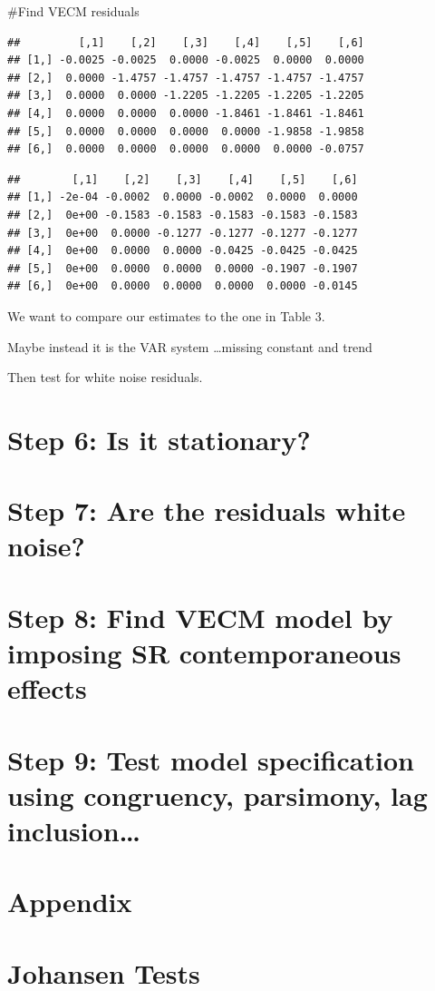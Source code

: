 \documentclass[11pt,preprint, authoryear]{elsarticle}
\numberwithin{equation}{section}
\numberwithin{figure}{section}
\numberwithin{table}{section}
\begin{document}
\#Find VECM residuals

\begin{verbatim}
##         [,1]    [,2]    [,3]    [,4]    [,5]    [,6]
## [1,] -0.0025 -0.0025  0.0000 -0.0025  0.0000  0.0000
## [2,]  0.0000 -1.4757 -1.4757 -1.4757 -1.4757 -1.4757
## [3,]  0.0000  0.0000 -1.2205 -1.2205 -1.2205 -1.2205
## [4,]  0.0000  0.0000  0.0000 -1.8461 -1.8461 -1.8461
## [5,]  0.0000  0.0000  0.0000  0.0000 -1.9858 -1.9858
## [6,]  0.0000  0.0000  0.0000  0.0000  0.0000 -0.0757
\end{verbatim}

\begin{verbatim}
##        [,1]    [,2]    [,3]    [,4]    [,5]    [,6]
## [1,] -2e-04 -0.0002  0.0000 -0.0002  0.0000  0.0000
## [2,]  0e+00 -0.1583 -0.1583 -0.1583 -0.1583 -0.1583
## [3,]  0e+00  0.0000 -0.1277 -0.1277 -0.1277 -0.1277
## [4,]  0e+00  0.0000  0.0000 -0.0425 -0.0425 -0.0425
## [5,]  0e+00  0.0000  0.0000  0.0000 -0.1907 -0.1907
## [6,]  0e+00  0.0000  0.0000  0.0000  0.0000 -0.0145
\end{verbatim}

We want to compare our estimates to the one in Table 3.

Maybe instead it is the VAR system \ldots missing constant and trend

Then test for white noise residuals.

\hypertarget{step-6-is-it-stationary}{%
\section{Step 6: Is it stationary?}\label{step-6-is-it-stationary}}

\hypertarget{step-7-are-the-residuals-white-noise}{%
\section{Step 7: Are the residuals white
noise?}\label{step-7-are-the-residuals-white-noise}}

\hypertarget{step-8-find-vecm-model-by-imposing-sr-contemporaneous-effects}{%
\section{Step 8: Find VECM model by imposing SR contemporaneous
effects}\label{step-8-find-vecm-model-by-imposing-sr-contemporaneous-effects}}

\hypertarget{step-9-test-model-specification-using-congruency-parsimony-lag-inclusion}{%
\section{Step 9: Test model specification using congruency, parsimony,
lag
inclusion\ldots{}}\label{step-9-test-model-specification-using-congruency-parsimony-lag-inclusion}}

\hypertarget{appendix}{%
\section*{Appendix}\label{appendix}}

\hypertarget{johansen-tests}{%
\section*{Johansen Tests}\label{johansen-tests}}


\end{document}
